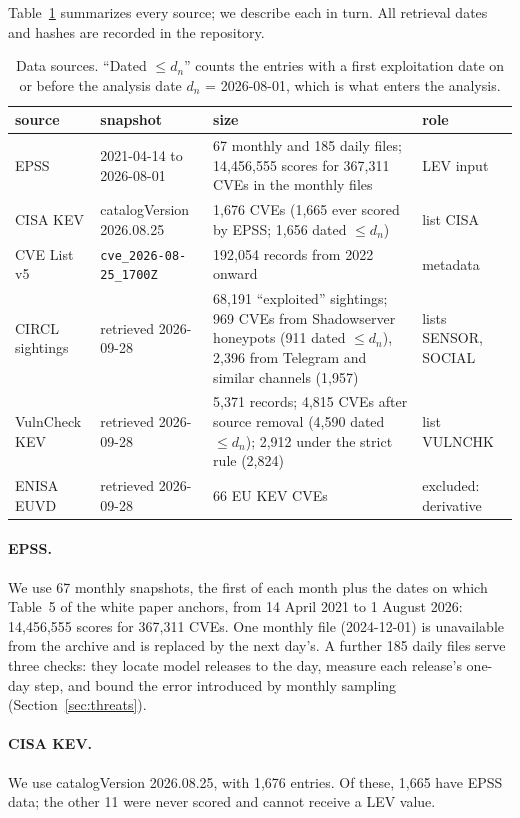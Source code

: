 Table~\ref{tab:data} summarizes every source; we describe each in turn. All
retrieval dates and hashes are recorded in the repository.

\begin{table}[t]
\centering\small
\caption{Data sources. ``Dated $\le d_n$'' counts the entries with a first
exploitation date on or before the analysis date $d_n$ = 2026-08-01, which is
what enters the analysis.}\label{tab:data}
\begin{tabularx}{\linewidth}{@{}p{2.1cm}p{3.6cm}Xp{2.6cm}@{}}
\toprule
source & snapshot & size & role \\
\midrule
EPSS & 2021-04-14 to 2026-08-01 & 67 monthly and 185 daily files; 14,456,555 scores for 367,311 CVEs in the monthly files & LEV input \\
CISA KEV & catalogVersion 2026.08.25 & 1,676 CVEs (1,665 ever scored by EPSS; 1,656 dated $\le d_n$) & list CISA \\
CVE List v5 & \texttt{cve\_2026-08-25\_1700Z} & 192,054 records from 2022 onward & metadata \\
CIRCL sightings & retrieved 2026-09-28 & 68,191 ``exploited'' sightings; 969 CVEs from Shadowserver honeypots (911 dated $\le d_n$), 2,396 from Telegram and similar channels (1,957) & lists SENSOR, SOCIAL \\
VulnCheck KEV & retrieved 2026-09-28 & 5,371 records; 4,815 CVEs after source removal (4,590 dated $\le d_n$); 2,912 under the strict rule (2,824) & list VULNCHK \\
ENISA EUVD & retrieved 2026-09-28 & 66 EU KEV CVEs & excluded: derivative \\
\bottomrule
\end{tabularx}
\end{table}

\paragraph{EPSS.} We use 67 monthly snapshots, the first of each month plus the
dates on which Table~5 of the white paper anchors, from 14 April 2021 to
1 August 2026: 14,456,555 scores for 367,311 CVEs. One monthly file
(2024-12-01) is unavailable from the archive and is replaced by the next day's.
A further 185 daily files serve three checks: they locate model releases to the
day, measure each release's one-day step, and bound the error introduced by
monthly sampling (Section~\ref{sec:threats}).

\paragraph{CISA KEV.} We use catalogVersion 2026.08.25, with 1,676 entries.
Of these, 1,665 have EPSS data; the other 11 were never scored and cannot
receive a LEV value.

